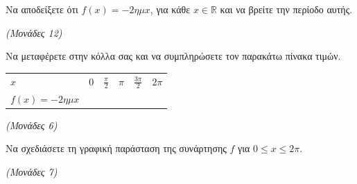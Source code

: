 \documentclass[11pt,a4paper,twoside]{book}
\newcommand{\monades}[1]{\hfill \textit{(Μονάδες #1)}}
\begin{document}
\begin{alist}
\item Να αποδείξετε ότι $f(x) = -2\eta\mu x$, για κάθε $x \in \mathbb{R}$ και να βρείτε την περίοδο αυτής.

\monades{12}

\item

\begin{rlist}
\item Να μεταφέρετε στην κόλλα σας και να συμπληρώσετε τον παρακάτω πίνακα τιμών.

\begin{longtable}[]{@{}
  >{\centering\arraybackslash}p{}
  >{\raggedright\arraybackslash}p{}
  >{\raggedright\arraybackslash}p{}
  >{\raggedright\arraybackslash}p{}
  >{\raggedright\arraybackslash}p{}
  >{\raggedright\arraybackslash}p{}@{}}
\noalign{}
\begin{minipage}[b]{\linewidth}\centering
$x$
\end{minipage} & \begin{minipage}[b]{\linewidth}\centering
$0$
\end{minipage} & \begin{minipage}[b]{\linewidth}\centering
$\frac{\pi}{2}$
\end{minipage} & \begin{minipage}[b]{\linewidth}\centering
$\pi$
\end{minipage} & \begin{minipage}[b]{\linewidth}\centering
$\frac{3\pi}{2}$
\end{minipage} & \begin{minipage}[b]{\linewidth}\raggedright
$2\pi$
\end{minipage} \\
\noalign{}

\noalign{}
\endlastfoot
$f(x) = -2\eta\mu x$ & & & & & \\
\end{longtable}

\monades{6}

\item Να σχεδιάσετε τη γραφική παράσταση της συνάρτησης $f$ για $0 \le x \le 2\pi$.

\monades{7}
\end{rlist}
\end{alist}
\end{document}
